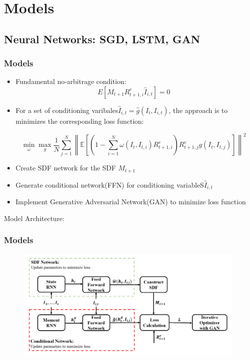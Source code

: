 \documentclass{beamer}
\begin{document}
\section{Models}
\subsection{Neural Networks: SGD, LSTM, GAN}


\begin{frame}

\frametitle{Models}

\begin{itemize}
\item Fundamental no-arbitrage condition:\\
$$E\left[M_{t+1} R_{t+1, i}^{e} \hat{I}_{i, t}\right]=0$$

\item For a set of conditioning varibales$\hat{I}_{i,t} = \hat{g}(I_{t}, I_{i,t})$, the approach is to minimizes the corresponding loss function:

$$\min _{\omega} \max _{g} \frac{1}{N} \sum_{j=1}^{N}\left\|\mathbb{E}\left[\left(1-\sum_{i=1}^{N} \omega\left(I_{t}, I_{t, i}\right) R_{t+1, i}^{e}\right) R_{t+1, j}^{e} g\left(I_{t}, I_{t, j}\right)\right]\right\|^{2}$$

\item Create SDF network for the SDF $M_{t+1}$

\item Generate conditional network(FFN) for conditioning variableS$\hat{I}_{i,t}$

\item Implement Generative Adversarial Network(GAN) to minimize loss function
\end{itemize}


\end{frame}
\begin{frame}
Model Architecture:
\frametitle{Models}
\begin{figure}
    \includegraphics[width=12cm, hight=13cm]{model architecture.png}
\end{figure}
\end{frame}
\end{document}
